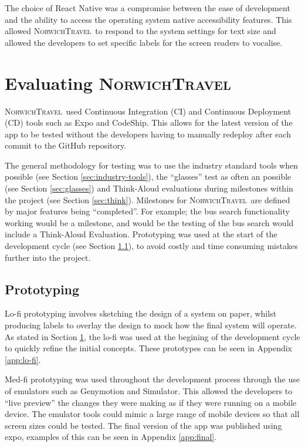 \documentclass[cmpstyle]{ueacmpstyle}
\newcommand{\nt}{\textsc{NorwichTravel}}
\begin{document}
		The choice of React Native was a compromise between the ease of development and the ability to access the operating system native accessibility features. This allowed \nt \ to respond to the system settings for text size and allowed the developers to set specific labels for the screen readers to vocalise. 
		
	\section{Evaluating \nt} \label{sec:eval}
	\nt \ used Continuous Integration (CI) and Continuous Deployment (CD) tools such as Expo and CodeShip. This allows for the latest version of the app to be tested without the developers having to manually redeploy after each commit to the GitHub repository. 
	
	The general methodology for testing was to use the industry standard tools when possible (see Section \ref{sec:industry-tools}), the ``glasses'' test as often an possible (see Section \ref{sec:glasses}) and Think-Aloud evaluations during milestones within the project (see Section \ref{sec:think}). Milestones for \nt \ are defined by major features being ``completed''. For example; the bus search functionality working would be a milestone, and would be the testing of the bus search would include a Think-Aloud Evaluation. Prototyping was used at the start of the development cycle (see Section \ref{sec:proto}), to avoid costly and time consuming mistakes further into the project.
	
		\subsection{Prototyping} \label{sec:proto}
		Lo-fi prototyping involves sketching the design of a system on paper, whilst producing labels to overlay the design to mock how the final system will operate. As stated in Section \ref{sec:eval}, the lo-fi was used at the begining of the development cycle to quickly refine the initial concepts. These prototypes can be seen in Appendix \ref{app:lo-fi}.
		
		Med-fi prototyping was used throughout the development process through the use of emulators such as Genymotion and Simulator. This allowed the developers to ``live preview'' the changes they were making as if they were running on a mobile device. The emulator tools could mimic a large range of mobile devices so that all screen sizes could be tested. The final version of the app was published using expo, examples of this can be seen in Appendix \ref{app:final}.
			
\end{document}
